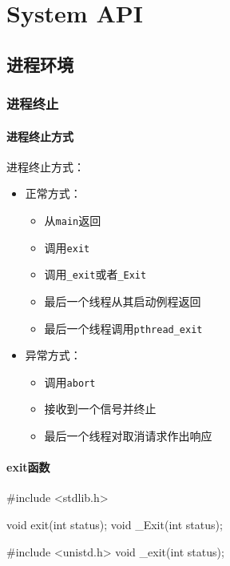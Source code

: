 \chapter{System API}


\section{进程环境}

\subsection{进程终止}


\subsubsection{进程终止方式}
进程终止方式：
\begin{itemize}
\item 正常方式：
\begin{itemize}
\item 从\lstinline$main$返回
\item 调用\lstinline$exit$
\item 调用\lstinline$_exit$或者\lstinline$_Exit$
\item 最后一个线程从其启动例程返回
\item 最后一个线程调用\lstinline$pthread_exit$
\end{itemize}
\item 异常方式：
\begin{itemize}
\item 调用\lstinline$abort$
\item 接收到一个信号并终止
\item 最后一个线程对取消请求作出响应
\end{itemize}
\end{itemize}

\subsubsection{exit函数}

\begin{C}
#include <stdlib.h>

void exit(int status);
void _Exit(int status);
\end{C}

\begin{C}
#include <unistd.h>
void _exit(int status);
\end{C}


